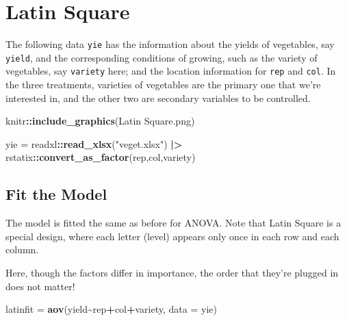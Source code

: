 \documentclass[
]{ctexart}
\newenvironment{Shaded}{\begin{snugshade}}{\end{snugshade}}
\newcommand{\AttributeTok}[1]{\textcolor[rgb]{0.13,0.29,0.53}{#1}}
\newcommand{\FunctionTok}[1]{\textcolor[rgb]{0.13,0.29,0.53}{\textbf{#1}}}
\newcommand{\NormalTok}[1]{#1}
\newcommand{\OtherTok}[1]{\textcolor[rgb]{0.56,0.35,0.01}{#1}}
\newcommand{\SpecialCharTok}[1]{\textcolor[rgb]{0.81,0.36,0.00}{\textbf{#1}}}
\newcommand{\StringTok}[1]{\textcolor[rgb]{0.31,0.60,0.02}{#1}}
\begin{document}
\hypertarget{latin-square}{%
\section{Latin Square}\label{latin-square}}

The following data \texttt{yie} has the information about the yields of
vegetables, say \texttt{yield}, and the corresponding conditions of
growing, such as the variety of vegetables, say \texttt{variety} here;
and the location information for \texttt{rep} and \texttt{col}. In the
three treatments, varieties of vegetables are the primary one that we're
interested in, and the other two are secondary variables to be
controlled.

\begin{Shaded}
\begin{Highlighting}[]
\NormalTok{knitr}\SpecialCharTok{::}\FunctionTok{include\_graphics}\NormalTok{(}\StringTok{\textquotesingle{}Latin Square.png\textquotesingle{}}\NormalTok{)}
\end{Highlighting}
\end{Shaded}

\begin{Shaded}
\begin{Highlighting}[]
\NormalTok{yie }\OtherTok{=}\NormalTok{ readxl}\SpecialCharTok{::}\FunctionTok{read\_xlsx}\NormalTok{(}\StringTok{"veget.xlsx"}\NormalTok{) }\SpecialCharTok{|\textgreater{}} 
\NormalTok{  rstatix}\SpecialCharTok{::}\FunctionTok{convert\_as\_factor}\NormalTok{(rep,col,variety)}
\end{Highlighting}
\end{Shaded}

\hypertarget{fit-the-model-1}{%
\subsection{Fit the Model}\label{fit-the-model-1}}

The model is fitted the same as before for ANOVA. Note that Latin Square
is a special design, where each letter (level) appears only once in each
row and each column.

Here, though the factors differ in importance, the order that they're
plugged in does not matter!

\begin{Shaded}
\begin{Highlighting}[]
\NormalTok{latinfit }\OtherTok{=} \FunctionTok{aov}\NormalTok{(yield}\SpecialCharTok{\textasciitilde{}}\NormalTok{rep}\SpecialCharTok{+}\NormalTok{col}\SpecialCharTok{+}\NormalTok{variety,}
           \AttributeTok{data =}\NormalTok{ yie)}
\end{Highlighting}
\end{Shaded}
\end{document}
